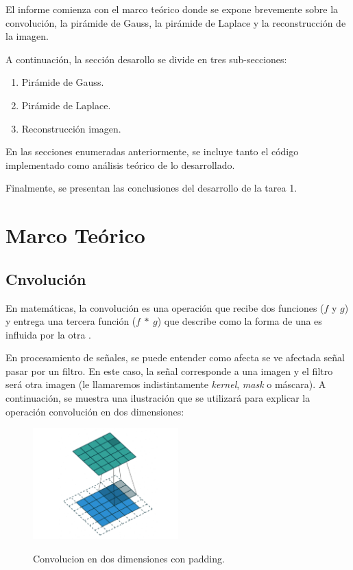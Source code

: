 \par El informe comienza con el marco teórico donde se expone brevemente sobre la convolución, la pirámide de Gauss, la pirámide de Laplace y la reconstrucción de la imagen. 

\par A continuación, la sección desarollo se divide en tres sub-secciones:
\begin{enumerate}
  \item Pirámide de Gauss.
  \item Pirámide de Laplace.
  \item Reconstrucción imagen. 
\end{enumerate}

\par En las secciones enumeradas anteriormente, se incluye tanto el código implementado como análisis teórico de lo desarrollado. 

\par Finalmente, se presentan las conclusiones del desarrollo de la tarea 1. 

\newpage
\section{Marco Teórico}
\subsection{Cnvolución}

\par En matemáticas, la convolución es una operación que recibe dos funciones ($f$ y $g$) y entrega una tercera función ($f \: \ast \: g $) que describe como la forma de una es influida por la otra \cite{WikiConv}.
\par En procesamiento de señales, se puede entender como afecta se ve afectada señal  pasar por un filtro. En este caso, la señal corresponde a una imagen y el filtro será otra imagen (le llamaremos indistintamente \textit{kernel}, \textit{mask} o máscara). A continuación, se muestra una ilustración que se utilizará para explicar la operación convolución en dos dimensiones:

\begin{figure}[H]
  \centering
  \includegraphics[width = 0.5\textwidth]{conv2d.png}
  \label{conv2d}
  \caption{Convolucion en dos dimensiones con padding.\cite{imConv2d}}
\end{figure}

